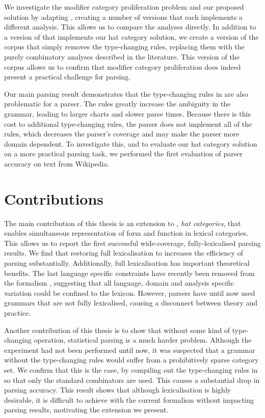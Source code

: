 We investigate the modifier category proliferation problem and our proposed
solution by adapting \ccgbank, creating a number of versions that each
implements a different analysis. This allows us to compare the analyses
directly. In addition to a version of \ccgbank that implements our hat category
solution, we create a version of the corpus that simply removes the
type-changing rules, replacing them with the purely combinatory analyses
described in the \ccg literature. This version of the corpus allows us to
confirm that modifier category proliferation does indeed present a practical
challenge for \ccg parsing.

Our main parsing result demonstrates that the type-changing rules in \ccgbank
are also problematic for a \ccg parser. The rules greatly increase the ambiguity
in the grammar, leading to larger charts and slower parse times. Because there
is this cost to additional type-changing rules, the \candc parser does not
implement all of the rules, which decreases the parser's coverage and may make
the parser more domain dependent. To investigate this, and to evaluate our
hat category solution on a more practical parsing task, we performed the first
 evaluation of parser accuracy on text from Wikipedia.

\section{Contributions}

The main contribution of this thesis is an extension to \ccg, \emph{hat
categories}, that enables simultaneous representation of form and function in
lexical categories. This allows us to report the first successful wide-coverage,
fully-lexicalised \ccg parsing results. We find that restoring full
lexicalisation to \ccgbank increases the efficiency of \ccg parsing
substantially. Additionally, full lexicalisation has
important theoretical benefits. The last language specific constraints have
recently been removed from the \ccg formalism \citep{baldridge:03}, suggesting
that all language, domain and analysis specific variation could be confined to
the lexicon. However, \ccg parsers have until now used grammars that are not
fully lexicalised, causing a disconnect between \ccg theory and practice.

Another contribution of this thesis is to show that without some kind of
type-changing operation, statistical \ccg parsing is a much harder problem.
Although the experiment had not been performed until now, it was suspected that a
\ccg grammar without the \ccgbank type-changing rules would suffer from
a prohibitively sparse category set. We confirm that this is the case,
by compiling out the type-changing rules
in \ccgbank so that only the standard \ccg combinators are used. This causes a
substantial drop in parsing accuracy. This result shows that although
lexicalisation is highly desirable, it is difficult to achieve with the current
\ccg formalism without impacting parsing results, motivating the extension we present.

